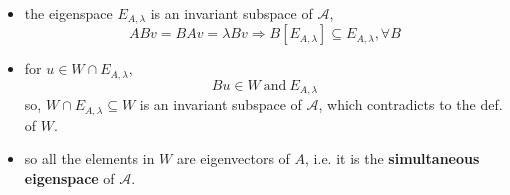 \begin{itemize}
\begin{tcolorbox}[title=proof:]
\begin{itemize}
			\noindent\rule[0.5ex]{\linewidth}{0.5pt} %
			
			\item the eigenspace $E_{A, \lambda}$ is an invariant subspace of $\mathcal{A}$,
			\begin{equation}
				A B v = B A v = \lambda B v \Longrightarrow B[E_{A, \lambda}] \subseteq E_{A, \lambda}, \forall B
			\end{equation}
			
			\item for $u \in W \cap E_{A, \lambda}$,
			\begin{equation}
				B u \in W \ \text{and} \ E_{A, \lambda}
			\end{equation}
			so, $W \cap E_{A, \lambda} \subseteq W$ is an invariant subspace of $\mathcal{A}$, which contradicts to the def. of $W$.
			
			\item so all the elements in $W$ are eigenvectors of $A$, i.e. it is the \textbf{simultaneous eigenspace} of $\mathcal{A}$.
		\end{itemize}
	\end{tcolorbox}
\end{itemize}


